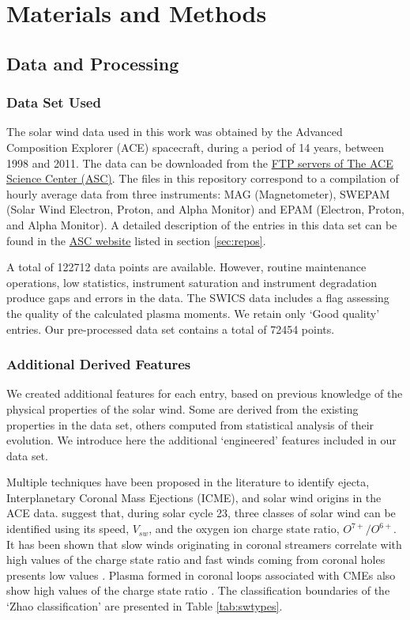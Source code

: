 \documentclass[utf8]{frontiersSCNS} %
\begin{document}
\section{Materials and Methods}

\subsection{Data and Processing}
\label{sec:dataprocessing}
\subsubsection{Data Set Used}
The solar wind data used in this work was obtained by the Advanced Composition Explorer (ACE) spacecraft, during a period of 14 years, between 1998 and 2011. The data can be downloaded from the \href{ftp://mussel.srl.caltech.edu/pub/ace/level2/multi}{FTP servers of The ACE Science Center (ASC)}. The files in this repository correspond to a compilation of hourly average data from three instruments: MAG (Magnetometer), SWEPAM (Solar Wind Electron, Proton, and Alpha Monitor) and EPAM (Electron, Proton, and Alpha Monitor). A detailed description of the entries in this data set can be found in the \href{http://www.srl.caltech.edu/cgi-bin/dib/rundibviewmultil2/ACE/ASC/DATA/level2/multi}{ASC website} listed in section \ref{sec:repos}.

A total of 122712 data points are available. However, routine maintenance operations, low statistics, instrument saturation and instrument degradation produce gaps and errors in the data. The SWICS data includes a flag assessing the quality of the calculated plasma moments. We retain only `Good quality' entries. Our pre-processed data set contains a total of 72454 points.

\subsubsection{Additional Derived Features}
We created additional features for each entry, based on previous knowledge of the physical properties of the solar wind. Some are derived from the existing properties in the data set, others computed from statistical analysis of their evolution. We introduce here the additional `engineered' features included in our data set.

Multiple techniques have been proposed in the literature to identify ejecta, Interplanetary Coronal Mass Ejections (ICME), and solar wind origins in the ACE data. \citep{Zhao2009} suggest that, during solar cycle 23, three classes of solar wind can be identified using its speed, $V_{sw}$, and the oxygen ion charge state ratio, $O^{7+}/O^{6+}$. It has been shown that slow winds originating in coronal streamers correlate with high values of the charge state ratio and fast winds coming from coronal holes presents low values \citep{DAmicis2015}. Plasma formed in coronal loops associated with CMEs also show high values of the charge state ratio \citep{Xu2015b}. The classification boundaries of the `Zhao classification' are presented in Table \ref{tab:swtypes}.
\end{document}
